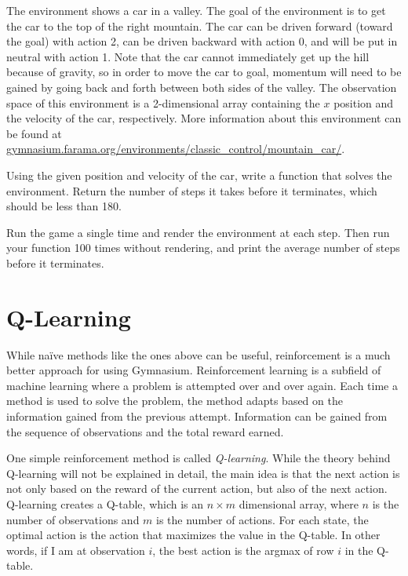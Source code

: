 \begin{problem}
The environment  shows a car in a valley.
The goal of the environment is to get the car to the top of the right mountain.
The car can be driven forward (toward the goal) with action 2, can be driven backward with action 0, and will be put in neutral with action 1.
Note that the car cannot immediately get up the hill because of gravity, so in order to move the car to goal, momentum will need to be gained by going back and forth between both sides of the valley.
The observation space of this environment is a 2-dimensional array containing the $x$ position and the velocity of the car, respectively.
More information about this environment can be found at \url{gymnasium.farama.org/environments/classic_control/mountain_car/}.

Using the given position and velocity of the car, write a function  that solves the  environment.
Return the number of steps it takes before it terminates, which should be less than 180.

Run the game a single time and render the environment at each step. 
Then run your function 100 times without rendering, and print the average number of steps before it terminates.
\label{prob:car}
\end{problem}

\section*{Q-Learning}
While na\"{i}ve methods like the ones above can be useful, reinforcement is a much better approach for using Gymnasium.
Reinforcement learning is a subfield of machine learning where a problem is attempted over and over again. Each time a method is used to solve the problem, the method adapts based on the information gained from the previous attempt.
Information can be gained from the sequence of observations and the total reward earned.

One simple reinforcement method is called \emph{Q-learning}.
While the theory behind Q-learning will not be explained in detail, the main idea is that the next action is not only based on the reward of the current action, but also of the next action.
Q-learning creates a Q-table, which is an $n\times m$ dimensional array, where $n$ is the number of observations and $m$ is the number of actions.
For each state, the optimal action is the action that maximizes the value in the Q-table.
In other words, if I am at observation $i$, the best action is the argmax of row $i$ in the Q-table.

